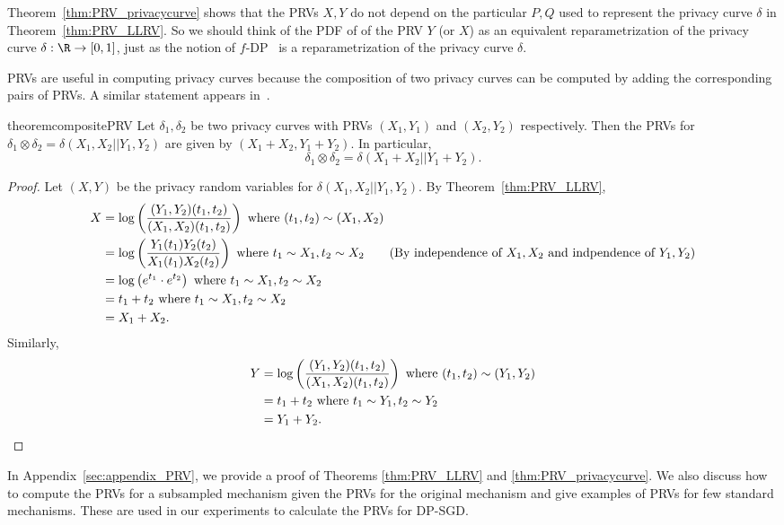 \begin{remark}
	Theorem~\ref{thm:PRV_privacycurve} shows that the PRVs $X,Y$ do not depend on the particular $P,Q$ used to represent the privacy curve $\delta$ in Theorem~\ref{thm:PRV_LLRV}. So we should think of the PDF of of the PRV $Y$ (or $X$) as an equivalent reparametrization of the privacy curve $\delta:\R \to [0,1]$, just as the notion of $f$-DP~\cite{DongRS19} is a reparametrization of the privacy curve $\delta$. %
\end{remark}





PRVs are useful in computing privacy curves because the composition of two privacy curves can be computed by adding the corresponding pairs of PRVs. A similar statement appears in~\cite{DR16}.
\begin{restatable}{theorem}{compositePRV}
\label{thm:composition_PRVs}
Let $\delta_1,\delta_2$ be two privacy curves with PRVs $(X_1,Y_1)$ and $(X_2,Y_2)$ respectively. Then the PRVs for $\delta_1 \otimes \delta_2=\delta(X_1,X_2||Y_1,Y_2)$ are given by $(X_1+X_2,Y_1+Y_2)$. In particular, $$\delta_1\otimes \delta_2 = \delta(X_1+X_2||Y_1+Y_2).$$
\end{restatable}
\begin{proof}
Let $(X,Y)$ be the privacy random variables for $\delta(X_1,X_2||Y_1,Y_2)$. By Theorem~\ref{thm:PRV_LLRV},
\begin{align*}
	X & = \log\left(\frac{(Y_1,Y_2)(t_1,t_2)}{(X_1,X_2)(t_1,t_2)}\right) \text{ where } (t_1,t_2)\sim (X_1,X_2)\\
	& = \log\left(\frac{Y_1(t_1)Y_2(t_2)}{X_1(t_1)X_2(t_2)}\right) \text{ where } t_1\sim X_1,t_2\sim X_2\tag{By independence of $X_1,X_2$ and indpendence of $Y_1,Y_2$}\\
	& = \log\left( e^{t_1} \cdot e^{t_2}\right) \text{ where } t_1\sim X_1,t_2\sim X_2\\
	& = t_1+t_2 \text{ where } t_1\sim X_1,t_2\sim X_2\\
	& = X_1 + X_2.
\end{align*}
Similarly, \begin{align*}
	Y & = \log\left(\frac{(Y_1,Y_2)(t_1,t_2)}{(X_1,X_2)(t_1,t_2)}\right) \text{ where } (t_1,t_2)\sim (Y_1,Y_2)\\
	& = t_1+t_2 \text{ where } t_1\sim Y_1,t_2\sim Y_2\\
	& = Y_1 + Y_2.
\end{align*}
\end{proof}


In Appendix~\ref{sec:appendix_PRV}, we provide a proof of Theorems \ref{thm:PRV_LLRV} and \ref{thm:PRV_privacycurve}. We also discuss how to compute the PRVs for a subsampled mechanism given the PRVs for the original mechanism and give examples of PRVs for few standard mechanisms. These are used in our experiments to calculate the PRVs for DP-SGD.
